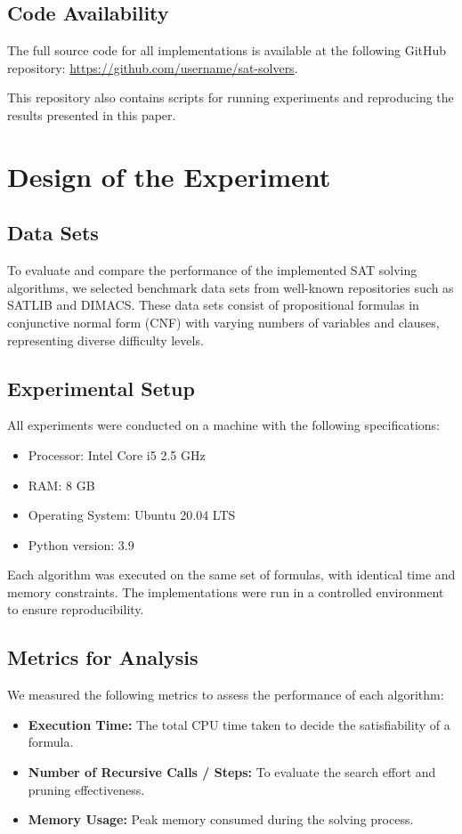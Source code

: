 \documentclass{article}
\begin{document}
\subsection{Code Availability}
The full source code for all implementations is available at the following GitHub repository: \url{https://github.com/username/sat-solvers}.

This repository also contains scripts for running experiments and reproducing the results presented in this paper.

\section{Design of the Experiment}

\subsection{Data Sets}
To evaluate and compare the performance of the implemented SAT solving algorithms, we selected benchmark data sets from well-known repositories such as SATLIB and DIMACS. These data sets consist of propositional formulas in conjunctive normal form (CNF) with varying numbers of variables and clauses, representing diverse difficulty levels.

\subsection{Experimental Setup}
All experiments were conducted on a machine with the following specifications:
\begin{itemize}
    \item Processor: Intel Core i5 2.5 GHz
    \item RAM: 8 GB
    \item Operating System: Ubuntu 20.04 LTS
    \item Python version: 3.9
\end{itemize}

Each algorithm was executed on the same set of formulas, with identical time and memory constraints. The implementations were run in a controlled environment to ensure reproducibility.

\subsection{Metrics for Analysis}
We measured the following metrics to assess the performance of each algorithm:
\begin{itemize}
    \item \textbf{Execution Time:} The total CPU time taken to decide the satisfiability of a formula.
    \item \textbf{Number of Recursive Calls / Steps:} To evaluate the search effort and pruning effectiveness.
    \item \textbf{Memory Usage:} Peak memory consumed during the solving process.
\end{itemize}
\end{document}
